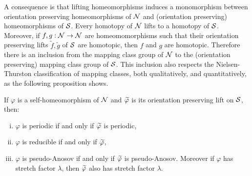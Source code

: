 A consequence is that lifting homeomorphisms induces a monomorphism between orientation preserving homeomorphisms of $\mathcal{N}$ and (orientation preserving) homeomorphisms of $\mathcal{S}$.  Every homotopy of $\mathcal{N}$ lifts to a homotopy of $\mathcal{S}$.  Moreover, if $f,g:\mathcal{N}\to\mathcal{N}$ are homeomomorphisms such that their orientation preserving lifts $\widetilde{f},\widetilde{g}$ of $\mathcal{S}$ are homotopic, then $f$ and $g$ are homotopic.  Therefore there is an inclusion from the mapping class group of $\mathcal{N}$ to the (orientation preserving) mapping class group of $\mathcal{S}$.  This inclusion also respects the Nielsen-Thurston classification of mapping classes, both qualitatively, and
quantitatively, as the following proposition shows.
\begin{prop}
  \label{prop:2}
  If $\varphi$ is a self-homeomorphism of $\mathcal{N}$ and $\widetilde{\varphi}$ is its orientation preserving lift on $\mathcal{S}$, then:
  \begin{enumerate}[(i)]
  \item $\varphi$ is periodic if and only if $\widetilde{\varphi}$ is periodic,
  \item $\varphi$ is reducible if and only if $\widetilde{\varphi}$,
  \item $\varphi$ is pseudo-Anosov if and only if $\widetilde{\varphi}$ is pseudo-Anosov.  Moreover if $\varphi$ has stretch factor $\lambda$, then $\widetilde{\varphi}$ also has stretch factor $\lambda$.
  \end{enumerate}
\end{prop}
